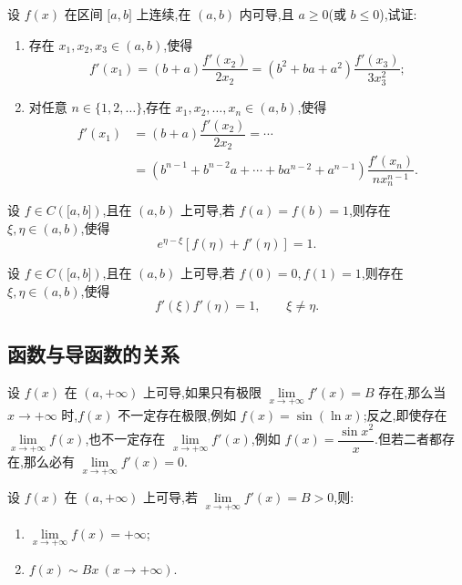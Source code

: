 \documentclass[../数学分析培优讲义.tex]{subfiles}
\begin{document}
\begin{example}
设 $f(x)$ 在区间 $\lbrack a,b\rbrack$ 上连续,在 $(a,b)$ 内可导,且 $a\geq0$(或 $b\leq0$),试证:
\begin{enumerate}[label=(\arabic*)]
    \item 存在 $x_1,x_2,x_3\in(a,b)$,使得
    \[
        f'(x_1)
        =(b+a)\dfrac{f'(x_2)}{2x_2}
        =(b^2+ba+a^2)\dfrac{f'(x_3)}{3x_3^2};
    \]
    \item 对任意 $n\in\{1,2,\ldots\}$,存在 $x_1,x_2,\ldots,x_n\in(a,b)$,使得
    \[
    \begin{aligned}
        f'(x_1)
        &=(b+a)\dfrac{f'(x_2)}{2x_2}
        =\cdots\\
        &=(b^{n-1}+b^{n-2}a+\cdots+ba^{n-2}+a^{n-1})
        \dfrac{f'(x_n)}{nx_n^{n-1}}.
    \end{aligned}
    \]
\end{enumerate}
\end{example}
\exampleblank

\begin{example}
设 $f\in C(\lbrack a,b\rbrack)$,且在 $(a,b)$ 上可导,若 $f(a)=f(b)=1$,则存在 $\xi,\eta\in(a,b)$,使得
\[
    e^{\eta-\xi}[f(\eta)+f'(\eta)]=1.
\]
\end{example}
\exampleblank

\begin{example}
设 $f\in C(\lbrack a,b\rbrack)$,且在 $(a,b)$ 上可导,若 $f(0)=0,f(1)=1$,则存在 $\xi,\eta\in(a,b)$,使得
\[
    f'(\xi)f'(\eta)=1,
    \qquad \xi\neq\eta.
\]
\end{example}
\exampleblank


\newpage

\subsection{函数与导函数的关系}

设 $f(x)$ 在 $(a,+\infty)$ 上可导,如果只有极限 $\displaystyle\lim\limits_{x\to+\infty}f'(x)=B$ 存在,那么当 $x\to+\infty$ 时,$f(x)$ 不一定存在极限,例如 $f(x)=\sin(\ln x)$;反之,即使存在 $\displaystyle\lim\limits_{x\to+\infty}f(x)$,也不一定存在 $\displaystyle\lim\limits_{x\to+\infty}f'(x)$,例如 $f(x)=\dfrac{\sin x^2}{x}$.但若二者都存在,那么必有 $\displaystyle\lim\limits_{x\to+\infty}f'(x)=0$.

\begin{example}
设 $f(x)$ 在 $(a,+\infty)$ 上可导,若 $\displaystyle\lim\limits_{x\to+\infty}f'(x)=B>0$,则:
\begin{enumerate}[label=(\arabic*)]
    \item $\displaystyle\lim\limits_{x\to+\infty}f(x)=+\infty$;
    \item $f(x)\sim Bx\ (x\to+\infty)$.
\end{enumerate}
\end{example}
\exampleblank
\end{document}
